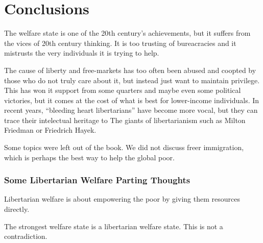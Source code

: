 \chapter{Conclusions}

The welfare state is one of the 20th century's achievements, but it suffers
from the vices of 20th century thinking. It is too trusting of bureacracies and
it mistrusts the very individuals it is trying to help.

The cause of liberty and free-markets has too often been abused and coopted by
those who do not truly care about it, but instead just want to maintain
privilege. This has won it support from some quarters and maybe even some
political victories, but it comes at the cost of what is best for lower-income
individuals. In recent years, ``bleeding heart libertarians'' have become more
vocal, but they can trace their intelectual heritage to The giants of
libertarianism such as Milton Friedman or Friedrich Hayek.

Some topics were left out of the book. We did not discuss freer immigration,
which is perhaps the best way to help the global poor.

\subsection{Some Libertarian Welfare Parting Thoughts}

\thought Libertarian welfare is about empowering the poor by giving them
resources directly.

\thought The strongest welfare state is a libertarian welfare state. This is
not a contradiction.

